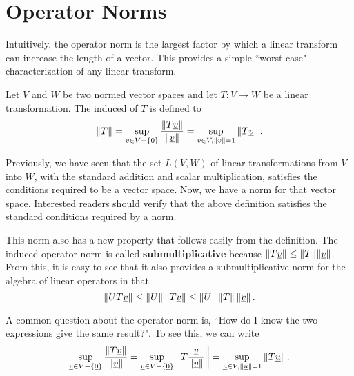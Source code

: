\section{Operator Norms}

Intuitively, the operator norm is the largest factor by which a linear transform can increase the length of a vector.
This provides a simple ``worst-case" characterization of any linear transform.

\begin{definition}
Let $V$ and $W$ be two normed vector spaces and let $T : V \rightarrow W$ be a linear transformation.
The induced  of $T$ is defined to
\begin{equation*}
\left\| T \right\|
= \sup_{ \underline{v} \in V - \left\{ \underline{0} \right\} }
\frac{ \left\| T \underline{v} \right\| }{ \left\| \underline{v} \right\| }
= \sup_{\underline{v} \in V, \left\| \underline{v} \right\| = 1 }
\left\| T \underline{v} \right\| .
\end{equation*}
\end{definition}

Previously, we have seen that the set $L(V,W)$ of linear transformations from $V$ into $W$, with the standard addition and scalar multiplication, satisfies the conditions required to be a vector space.
Now, we have a norm for that vector space.
Interested readers should verify that the above definition satisfies the standard conditions required by a norm.

This norm also has a new property that follows easily from the definition.
The induced operator norm is called \textbf{submultiplicative} because $\| T \underline{v} \| \leq \| T \| \| \underline{v} \|$.
From this, it is easy to see that it also provides a submultiplicative norm for the algebra of linear operators in that
\begin{equation*}
\left\| U T \underline{v} \right\| \leq \left\| U \right\| \left\| T \underline{v} \right\| \leq \left\| U \right\| \left\| T \right\| \left\| \underline{v} \right\| .
\end{equation*}

A common question about the operator norm is, ``How do I know the two expressions give the same result?".
To see this, we can write
\begin{equation*}
\sup_{ \underline{v} \in V - \left\{ \underline{0} \right\} }
\frac{ \left\| T \underline{v} \right\| }{ \left\| \underline{v} \right\| }
= \sup_{ \underline{v} \in V - \left\{ \underline{0} \right\} }
\left\| T \frac{\underline{v}}{\| \underline{v} \|} \right\|
= \sup_{\underline{u} \in V, \left\| \underline{u} \right\| = 1 }
\left\| T \underline{u} \right\| .
\end{equation*}

